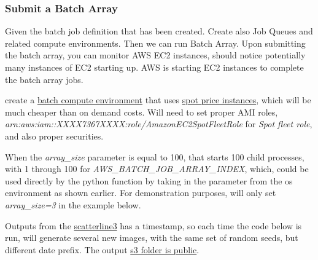 \documentclass[
]{book}
\begin{document}
\hypertarget{submit-a-batch-array}{%
\subsubsection{Submit a Batch Array}\label{submit-a-batch-array}}

Given the batch job definition that has been created. Create also Job Queues and related compute environments. Then we can run Batch Array. Upon submitting the batch array, you can monitor AWS EC2 instances, should notice potentially many instances of EC2 starting up. AWS is starting EC2 instances to complete the batch array jobs.

create a \href{https://docs.aws.amazon.com/batch/latest/userguide/compute_environments.html}{batch compute environment} that uses \href{https://aws.amazon.com/ec2/pricing/}{spot price instances}, which will be much cheaper than on demand costs. Will need to set proper AMI roles, \emph{arn:aws:iam::XXXX7367XXXX:role/AmazonEC2SpotFleetRole} for \emph{Spot fleet role}, and also proper securities.

When the \emph{array\_size} parameter is equal to 100, that starts 100 child processes, with 1 through 100 for \emph{AWS\_BATCH\_JOB\_ARRAY\_INDEX}, which, could be used directly by the python function by taking in the parameter from the os environment as shown earlier. For demonstration purposes, will only set \emph{array\_size=3} in the example below.

Outputs from the \href{https://github.com/FanWangEcon/pyfan/blob/master/pyfan/graph/exa/scatterline3.py\#L138}{scatterline3} has a timestamp, so each time the code below is run, will generate several new images, with the same set of random seeds, but different date prefix. The output \href{https://s3.console.aws.amazon.com/s3/buckets/fans3testbucket/pyfan_gph_scatter_line_rand/?region=us-east-1\&tab=overview}{s3 folder is public}.
\end{document}
